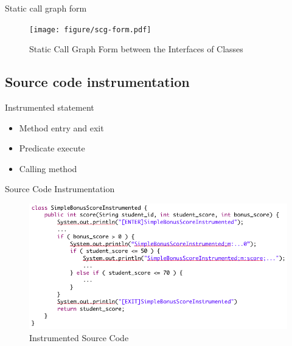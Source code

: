 \documentclass{beamer}
\begin{document}
\begin{frame}{Static call graph form}
    \begin{figure}
        \texttt{[image: figure/scg-form.pdf]}
        \caption{Static Call Graph Form between the Interfaces of Classes}
        \label{fig:scgForm}
    \end{figure}
\end{frame}

\subsection{Source code instrumentation}

\begin{frame}{Instrumented statement}
    \begin{itemize}
        \item Method entry and exit
        \item Predicate execute
        \item Calling method
    \end{itemize}
\end{frame}

\begin{frame}{Source Code Instrumentation}
    \begin{figure}
        \includegraphics[width=.8\paperwidth]{figure/instrumented-code.png}
        \caption{Instrumented Source Code}
        \label{fig:instrumentedSourceCode}
    \end{figure}
\end{frame}
\end{document}
